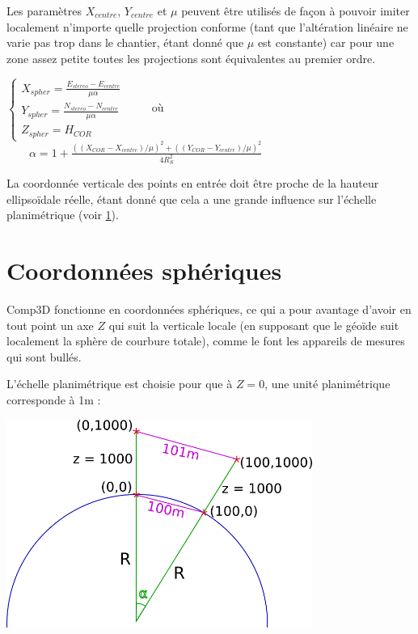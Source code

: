 \documentclass[french]{report}
\begin{document}
Les paramètres $X_{centre}$, $Y_{centre}$ et $\mu$ peuvent être utilisés de façon à pouvoir imiter localement n'importe quelle projection conforme
(tant que l'altération linéaire ne varie pas trop dans le chantier, étant donné que $\mu$ est constante)
car pour une zone assez petite toutes les projections sont équivalentes au premier ordre.


\begin{center}
$\left\{
  \begin{array}{c}
    X_{spher} = \frac{E_{stereo}-E_{centre}}{\mu \alpha} \\[0.3cm]
    Y_{spher} = \frac{N_{stereo}-N_{centre}}{\mu \alpha} \\[0.3cm]
    Z_{spher} = H_{COR}
  \end{array}
\right.
\qquad
$ où
$\qquad
\alpha = 1+ \frac{((X_{COR}-X_{centre})/\mu) ^2 + ((Y_{COR}-Y_{centre})/\mu) ^2}{ 4 R_S ^2}
$
\end{center}


La coordonnée verticale des points en entrée doit être proche de la hauteur ellipsoïdale réelle, étant donné que cela a une grande influence sur l'échelle planimétrique (voir \ref{spheriques}).


\section{Coordonnées sphériques}\label{spheriques}

Comp3D fonctionne en coordonnées sphériques, ce qui a pour avantage d'avoir en tout point un axe $Z$ qui suit la verticale locale (en supposant que le géoïde suit
localement la sphère de courbure totale), comme le font les appareils de mesures qui sont bullés.

L'échelle planimétrique est choisie pour que à $Z = 0$, une unité planimétrique corresponde à 1m :

\begin{center}
\includegraphics[width = 10cm]{images/coord_spher}
\end{center}
\end{document}
